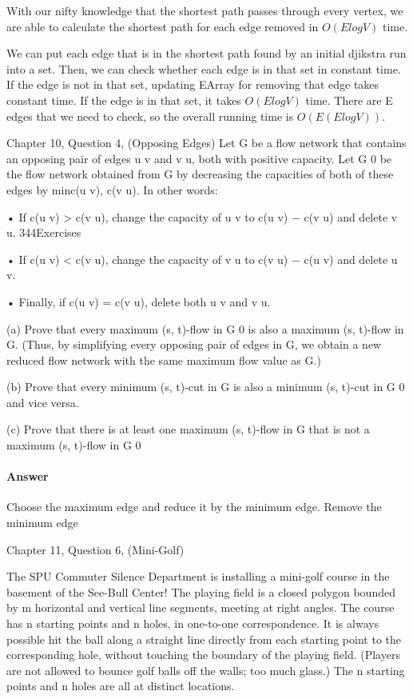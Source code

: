 \documentclass{article}
\begin{document}
With our nifty knowledge that the shortest path passes through every vertex, we
are able to calculate the shortest path for each edge removed in $O(E log V)$ time.

We can put each edge that is in the shortest path found by an initial djikstra run into a set. Then, we can check whether each edge is in that set in constant time. If the edge is not in that set, updating EArray for removing that edge takes constant time. If the edge is in that set, it takes $O(E log V)$ time. There are E edges that we need to check, so the overall running time is $O(E (E log V))$.

\collab{\todo{}}
\nextprob{}

Chapter 10, Question 4, (Opposing Edges)
Let G be a flow network that contains an opposing pair of edges u  v and
v  u, both with positive capacity. Let G 0 be the flow network obtained from G
by decreasing the capacities of both of these edges by min{c(u  v), c(v  u)}.
In other words:

• If c(u  v) > c(v  u), change the capacity of u  v to c(u  v) − c(v  u)
and delete v  u.
344Exercises

• If c(u  v) < c(v  u), change the capacity of v  u to c(v  u) − c(u  v)
and delete u  v.

• Finally, if c(u  v) = c(v  u), delete both u  v and v  u.

(a) Prove that every maximum (s, t)-flow in G 0 is also a maximum (s, t)-flow
in G. (Thus, by simplifying every opposing pair of edges in G, we obtain
a new reduced flow network with the same maximum flow value as G.)

(b) Prove that every minimum (s, t)-cut in G is also a minimum (s, t)-cut
in G 0 and vice versa.

(c) Prove that there is at least one maximum (s, t)-flow in G that is not a
maximum (s, t)-flow in G 0

\paragraph{Answer}

Choose the maximum edge and reduce it by the minimum edge. Remove the minimum edge


\collab{}
\nextprob{}

Chapter 11, Question 6, (Mini-Golf)

The SPU Commuter Silence Department is installing a mini-golf course in
the basement of the See-Bull Center! The playing field is a closed polygon
bounded by m horizontal and vertical line segments, meeting at right angles.
The course has n starting points and n holes, in one-to-one correspondence.
It is always possible hit the ball along a straight line directly from each
starting point to the corresponding hole, without touching the boundary
of the playing field. (Players are not allowed to bounce golf balls off the
walls; too much glass.) The n starting points and n holes are all at distinct
locations.
\end{document}
